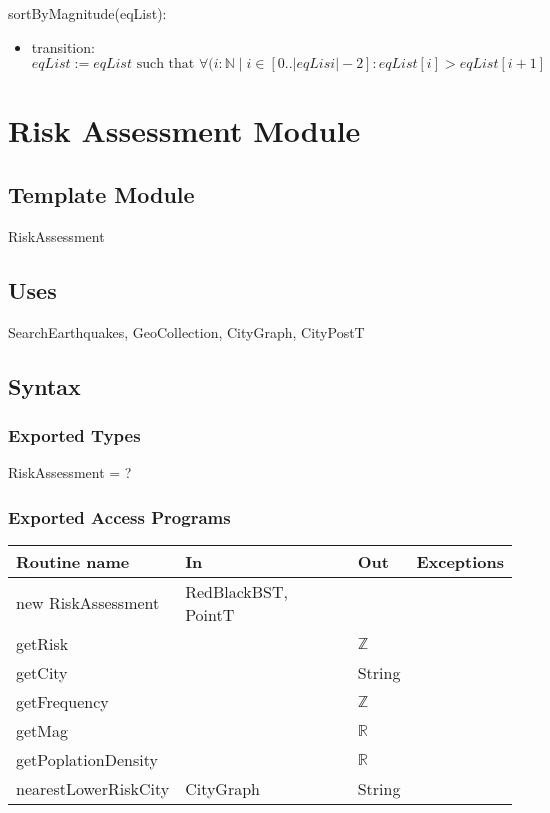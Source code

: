 \documentclass[12pt]{article}
\begin{document}
\noindent sortByMagnitude(eqList):
\begin{itemize}
\item transition: $\mathit{eqList} := eqList  
\mbox{ such that } \forall (i : \mathbb{N} \;|\; i \in [0..|eqLisi| - 2] :eqList[i] > eqList[i + 1]$
\end{itemize}






\newpage

\section* {Risk Assessment Module}

\subsection* {Template Module}

RiskAssessment

\subsection* {Uses}

SearchEarthquakes, GeoCollection, CityGraph, CityPostT

\subsection* {Syntax}

\subsubsection* {Exported Types}

RiskAssessment = ?


\subsubsection* {Exported Access Programs}

\begin{tabular}{| l | l | l | l |}
\hline
\textbf{Routine name} & \textbf{In} & \textbf{Out} & \textbf{Exceptions}\\
\hline
new RiskAssessment & RedBlackBST, PointT &  & \\
\hline
getRisk &  & $\mathbb{Z}$ & \\
\hline
getCity &  & String& \\
\hline
getFrequency &  & $\mathbb{Z}$ & \\
\hline
getMag &  & $\mathbb{R}$ & \\
\hline
getPoplationDensity &  & $\mathbb{R}$ & \\
\hline
nearestLowerRiskCity & CityGraph & String & \\
\hline
\end{tabular}
\end{document}
